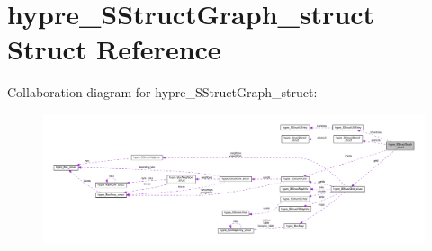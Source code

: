\hypertarget{structhypre__SStructGraph__struct}{}\section{hypre\+\_\+\+S\+Struct\+Graph\+\_\+struct Struct Reference}
\label{structhypre__SStructGraph__struct}


Collaboration diagram for hypre\+\_\+\+S\+Struct\+Graph\+\_\+struct\+:
\nopagebreak
\begin{figure}[H]
\begin{center}
\leavevmode
\includegraphics[width=350pt]{structhypre__SStructGraph__struct__coll__graph}
\end{center}
\end{figure}

